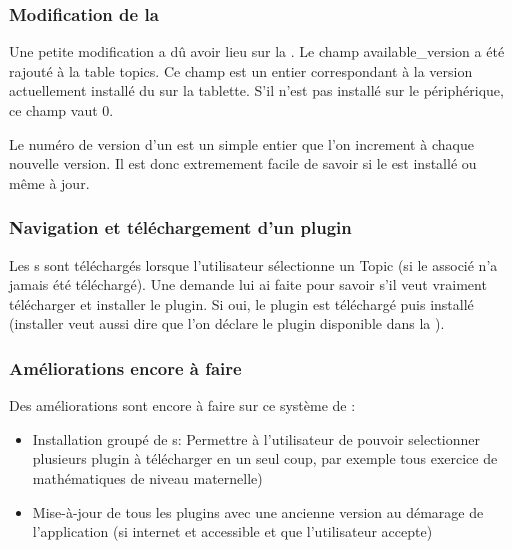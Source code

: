 \subsubsection{Modification de la \bdd{}}
Une petite modification a dû avoir lieu sur la \bdd{}. Le champ \og{}available\_version\fg{} a été rajouté à la table \og{}topics\fg{}. Ce champ est un entier correspondant à la version actuellement installé du \plugin{} sur la tablette. S'il n'est pas installé sur le périphérique, ce champ vaut \og{}$0$\fg{}.

Le numéro de version d'un \plugin{} est un simple entier que l'on increment à chaque nouvelle version. Il est donc extremement facile de savoir si le \plugin{} est installé ou même à jour.

\subsubsection{Navigation et téléchargement d'un plugin}
Les \plugin s sont téléchargés lorsque l'utilisateur sélectionne un Topic (si le \plugin{} associé n'a jamais été téléchargé). Une demande lui ai faite pour savoir s'il veut vraiment télécharger et installer le plugin. 
Si oui, le plugin est téléchargé puis installé (installer veut aussi dire que l'on déclare le plugin disponible dans la \bdd{}).

\subsubsection{Améliorations encore à faire}
Des améliorations sont encore à faire sur ce système de \plugin{}:
\begin{itemize}
    \item Installation groupé de \plugin s:
    \newline Permettre à l'utilisateur de pouvoir selectionner plusieurs plugin à télécharger en un seul coup, par exemple tous exercice de mathématiques de niveau maternelle)
    \item Mise-à-jour de tous les plugins avec une ancienne version au démarage de l'application (si internet et accessible et que l'utilisateur accepte)
\end{itemize}
